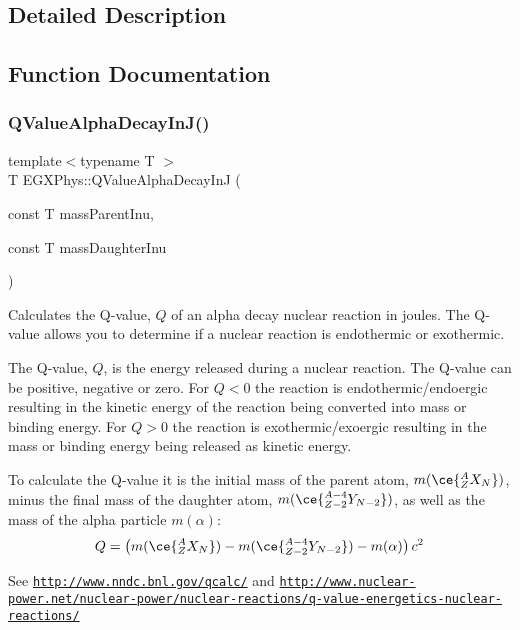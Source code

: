 \subsection{Detailed Description}


\subsection{Function Documentation}
\mbox{\label{group___e_g_x_phys-_q_value-_alpha_gab8a50c18f6de3c1b6ed280c26c3ff3a5}} 
\subsubsection{\texorpdfstring{Q\+Value\+Alpha\+Decay\+In\+J()}{QValueAlphaDecayInJ()}}
{\footnotesize\ttfamily template$<$typename T $>$ \\
T E\+G\+X\+Phys\+::\+Q\+Value\+Alpha\+Decay\+InJ (\begin{DoxyParamCaption}\item[{const T}]{mass\+Parent\+Inu,  }\item[{const T}]{mass\+Daughter\+Inu }\end{DoxyParamCaption})}



Calculates the Q-\/value, $Q$ of an alpha decay nuclear reaction in joules. The Q-\/value allows you to determine if a nuclear reaction is endothermic or exothermic. 

The Q-\/value, $Q$, is the energy released during a nuclear reaction. The Q-\/value can be positive, negative or zero. For $Q < 0$ the reaction is endothermic/endoergic resulting in the kinetic energy of the reaction being converted into mass or binding energy. For $Q > 0$ the reaction is exothermic/exoergic resulting in the mass or binding energy being released as kinetic energy.

To calculate the Q-\/value it is the initial mass of the parent atom, $m(\ce{ ^{A}_{Z}X_{N} })$, minus the final mass of the daughter atom, $m(\ce{ ^{A-4}_{Z-2}Y_{N-2} })$, as well as the mass of the alpha particle $m(\alpha)$\+: \[Q = \left ( m(\ce{ ^{A}_{Z}X_{N} })-m(\ce{ ^{A-4}_{Z-2}Y_{N-2} })-m(\alpha) \right) c^2\]

See \href{http://www.nndc.bnl.gov/qcalc/}{\tt http\+://www.\+nndc.\+bnl.\+gov/qcalc/} and \href{http://www.nuclear-power.net/nuclear-power/nuclear-reactions/q-value-energetics-nuclear-reactions/}{\tt http\+://www.\+nuclear-\/power.\+net/nuclear-\/power/nuclear-\/reactions/q-\/value-\/energetics-\/nuclear-\/reactions/}

